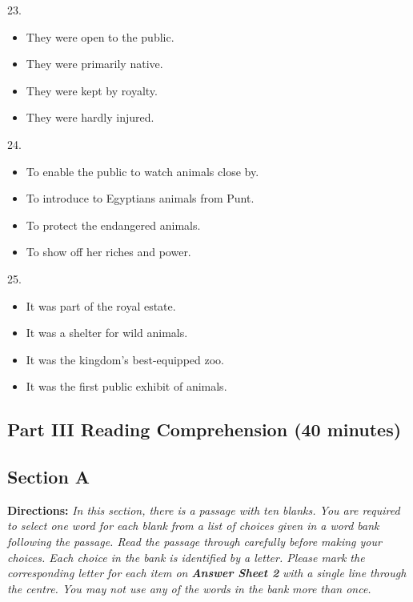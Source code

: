 \documentclass[UTF8,11pt]{ctexart}
\begin{document}
23.


\begin{itemize}[leftmargin=2em,itemsep=.2em,topsep=.4em]\item[A.] They were open to the public.
\item[B.] They were primarily native.
\item[C.] They were kept by royalty.
\item[D.] They were hardly injured.
\end{itemize}

24.


\begin{itemize}[leftmargin=2em,itemsep=.2em,topsep=.4em]\item[A.] To enable the public to watch animals close by.
\item[B.] To introduce to Egyptians animals from Punt.
\item[C.] To protect the endangered animals.
\item[D.] To show off her riches and power.
\end{itemize}

25.


\begin{itemize}[leftmargin=2em,itemsep=.2em,topsep=.4em]\item[A.] It was part of the royal estate.
\item[B.] It was a shelter for wild animals.
\item[C.] It was the kingdom’s best-equipped zoo.
\item[D.] It was the first public exhibit of animals.
\end{itemize}

\subsection*{\textbf{Part III Reading Comprehension (40 minutes)}}


\subsection*{\textbf{Section A}}


\textbf{Directions:} \textit{In this section, there is a passage with ten blanks. You are required to select one word for each blank} \textit{from a list of choices given in a word bank following the passage. Read the passage through carefully before} \textit{making your choices. Each choice in the bank is identified by a letter. Please mark the corresponding letter for} \textit{each item on }\textbf{\textit{Answer Sheet 2}}\textit{ with a single line through the centre. You may not use any of the words in the bank} \textit{more than once.}
\end{document}
